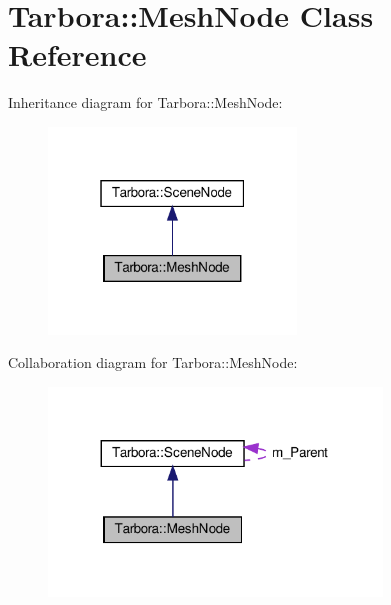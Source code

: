 \hypertarget{classTarbora_1_1MeshNode}{}\section{Tarbora\+:\+:Mesh\+Node Class Reference}
\label{classTarbora_1_1MeshNode}


Inheritance diagram for Tarbora\+:\+:Mesh\+Node\+:\nopagebreak
\begin{figure}[H]
\begin{center}
\leavevmode
\includegraphics[width=187pt]{classTarbora_1_1MeshNode__inherit__graph}
\end{center}
\end{figure}


Collaboration diagram for Tarbora\+:\+:Mesh\+Node\+:\nopagebreak
\begin{figure}[H]
\begin{center}
\leavevmode
\includegraphics[width=251pt]{classTarbora_1_1MeshNode__coll__graph}
\end{center}
\end{figure}

